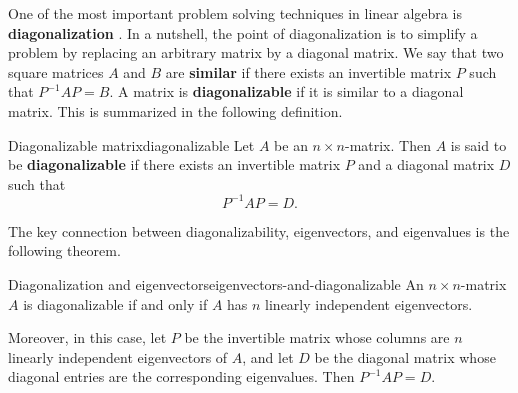 One of the most important problem solving techniques in linear algebra
is \textbf{diagonalization}%
%
. In a nutshell, the point of
diagonalization is to simplify a problem by replacing an arbitrary
matrix by a diagonal matrix. We say that two square matrices $A$ and
$B$ are \textbf{similar}%
%
 if there exists an invertible matrix $P$ such
that $P^{-1}AP = B$. A matrix is \textbf{diagonalizable}%
%
 if it is similar to a diagonal matrix.
This is summarized in the following definition.

\begin{definition}{Diagonalizable matrix}{diagonalizable}
  Let $A$ be an $n\times n$-matrix. Then $A$ is said to be
  \textbf{diagonalizable}%
   if there exists an invertible matrix
  $P$ and a diagonal matrix $D$ such that
  \begin{equation*}
    P^{-1}AP=D.
  \end{equation*}
\end{definition}

The key connection between diagonalizability, eigenvectors, and
eigenvalues is the following theorem.

\begin{theorem}{Diagonalization and eigenvectors}{eigenvectors-and-diagonalizable}
  An $n\times n$-matrix $A$ is diagonalizable if and only if $A$ has
  $n$ linearly independent eigenvectors.
  \bigskip

  Moreover, in this case, let $P$ be the invertible matrix whose
  columns are $n$ linearly independent eigenvectors of $A$, and let
  $D$ be the diagonal matrix whose diagonal entries are the
  corresponding eigenvalues. Then $P^{-1}AP=D$.
\end{theorem}

